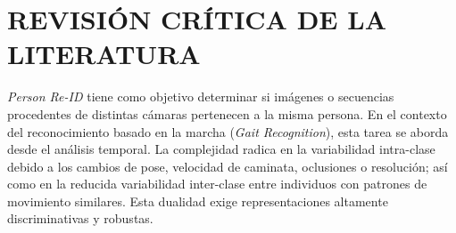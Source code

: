 \chapter{REVISIÓN CRÍTICA DE LA LITERATURA}

\textit{Person Re-ID} tiene como objetivo determinar si imágenes o secuencias procedentes de distintas cámaras pertenecen a la misma persona. En el contexto del reconocimiento basado en la marcha (\textit{Gait Recognition}), esta tarea se aborda desde el análisis temporal. La complejidad radica en la variabilidad intra-clase debido a los cambios de pose, velocidad de caminata, oclusiones o resolución; así como en la reducida variabilidad inter-clase entre individuos con patrones de movimiento similares. Esta dualidad exige representaciones altamente discriminativas y robustas.

